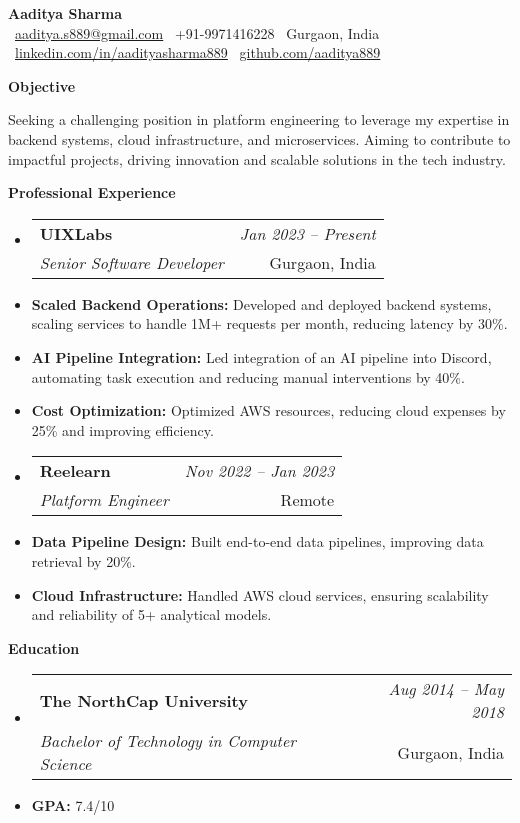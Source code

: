 \documentclass[a4paper,11pt]{article}
\makeatletter
\newcommand{\cvsection}[1]{
    \vspace{3mm}
    \begin{tcolorbox}[colframe=darkBlue, colback=gray!10, boxrule=0.4mm, width=\dimexpr\textwidth]
        \large \textbf{#1}
    \end{tcolorbox}
    \vspace{-1em}
}
\newcommand{\resumeItem}[2]{\item{\textbf{#1} {#2}}}
\newcommand{\resumeSubheading}[4]{
  \vspace{1mm}\item
    \begin{tabular*}{0.98\textwidth}[t]{l@{\extracolsep{\fill}}r}
        \textbf{#1} & \textit{\footnotesize{#4}} \\
        \textit{\footnotesize{#3}} &  \footnotesize{#2} \\
    \end{tabular*}\vspace{-0.5mm}
}
\makeatother
\begin{document}
\begin{center}
    {\Huge\textbf{Aaditya Sharma}} \\
    \vspace{1mm}
    \small{
    \faEnvelope\ \href{mailto:aaditya.s889@gmail.com}{aaditya.s889@gmail.com} \quad
    \faPhone\ +91-9971416228 \quad
    \faMapMarker\ Gurgaon, India \\
    \faLinkedin\ \href{https://www.linkedin.com/in/aadityasharma889/}{linkedin.com/in/aadityasharma889} \quad
    \faGithub\ \href{https://github.com/aaditya889}{github.com/aaditya889}
    }
\end{center}

\cvsection{Objective}
\vspace{1mm}
Seeking a challenging position in platform engineering to leverage my expertise in backend systems, cloud infrastructure, and microservices. Aiming to contribute to impactful projects, driving innovation and scalable solutions in the tech industry.

\cvsection{Professional Experience}
\begin{itemize}[leftmargin=0.5cm, labelsep=0.2cm]
  \resumeSubheading
      {UIXLabs}{Gurgaon, India}
      {Senior Software Developer}{Jan 2023 -- Present}
      \resumeItemListStart
        \resumeItem{Scaled Backend Operations:}{Developed and deployed backend systems, scaling services to handle 1M+ requests per month, reducing latency by 30\%.}
        \resumeItem{AI Pipeline Integration:}{Led integration of an AI pipeline into Discord, automating task execution and reducing manual interventions by 40\%.}
        \resumeItem{Cost Optimization:}{Optimized AWS resources, reducing cloud expenses by 25\% and improving efficiency.}
      \resumeItemListEnd
      
  \resumeSubheading
    {Reelearn}{Remote}
    {Platform Engineer}{Nov 2022 -- Jan 2023}
    \resumeItemListStart
      \resumeItem{Data Pipeline Design:}{Built end-to-end data pipelines, improving data retrieval by 20\%.}
      \resumeItem{Cloud Infrastructure:}{Handled AWS cloud services, ensuring scalability and reliability of 5+ analytical models.}
    \resumeItemListEnd
\end{itemize}

\cvsection{Education}
\begin{itemize}[leftmargin=0.5cm, labelsep=0.2cm]
    \resumeSubheading
    {The NorthCap University}{Gurgaon, India}
    {Bachelor of Technology in Computer Science}{Aug 2014 -- May 2018}
    \resumeItemListStart
      \resumeItem{GPA:}{7.4/10}
    \resumeItemListEnd
\end{itemize}
\end{document}
